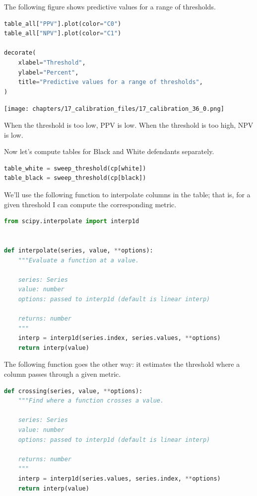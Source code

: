 The following figure shows predictive values for a range of thresholds.

\begin{lstlisting}[language=Python,style=source]
table_all["PPV"].plot(color="C0")
table_all["NPV"].plot(color="C1")

decorate(
    xlabel="Threshold",
    ylabel="Percent",
    title="Predictive values for a range of thresholds",
)
\end{lstlisting}

\begin{center}
\texttt{[image: chapters/17\_calibration\_files/17\_calibration\_36\_0.png]}
\end{center}

When the threshold is too low, PPV is low. When the threshold is too
high, NPV is low.

Now let's compute tables for Black and White defendants separately.

\begin{lstlisting}[language=Python,style=source]
table_white = sweep_threshold(cp[white])
table_black = sweep_threshold(cp[black])
\end{lstlisting}

We'll use the following function to interpolate columns in the table;
that is, for a given threshold I can compute the corresponding metric.

\begin{lstlisting}[language=Python,style=source]
from scipy.interpolate import interp1d


def interpolate(series, value, **options):
    """Evaluate a function at a value.

    series: Series
    value: number
    options: passed to interp1d (default is linear interp)

    returns: number
    """
    interp = interp1d(series.index, series.values, **options)
    return interp(value)
\end{lstlisting}

The following function goes the other way: it estimates the threshold
where a column passes through a given metric.

\begin{lstlisting}[language=Python,style=source]
def crossing(series, value, **options):
    """Find where a function crosses a value.

    series: Series
    value: number
    options: passed to interp1d (default is linear interp)

    returns: number
    """
    interp = interp1d(series.values, series.index, **options)
    return interp(value)
\end{lstlisting}

